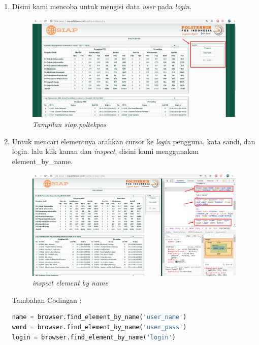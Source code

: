 \begin{enumerate}
\item Disini kami mencoba untuk mengisi data \textit{user} pada \textit{login}.
\begin{figure}[H]
    	\centering
    	\includegraphics[scale=0.3]{Figures/figures/siap.png}
    	\caption{\textit{Tampilan siap.poltekpos}}
    	\label{CLI}
	\end{figure}
\item Untuk mencari elementnya arahkan cursor ke \textit{login} pengguna, kata sandi, dan login. lalu klik kanan dan \textit{inspect}, disini kami menggunakan element\_by\_name.

\begin{figure}[H]
    	\centering
    	\includegraphics[scale=0.3]{Figures/figures/inspect1.png}
    	\caption{\textit{inspect element by name}}
    	\label{CLI}
	\end{figure}
	
Tambahan Codingan :
\begin{lstlisting}[language=Python]
name = browser.find_element_by_name('user_name')
word = browser.find_element_by_name('user_pass')
login = browser.find_element_by_name('login')

\end{lstlisting}


\end{enumerate}
